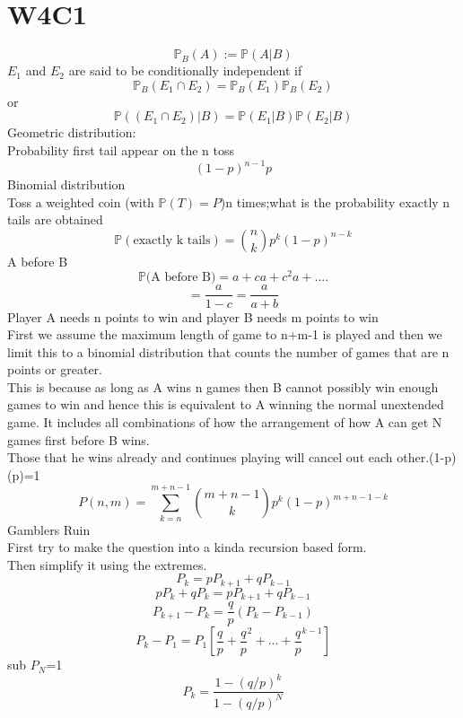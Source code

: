 \documentclass{article}
\begin{document}
\section{W4C1}
$$
\mathbb P_B(A):=\mathbb P(A|B)
$$
$E_1$ and $E_2$ are said to be conditionally independent if
$$
\mathbb P_B(E_1 \cap E_2)=\mathbb P_B(E_1)\mathbb P_B(E_2)
$$
or
$$
\mathbb P((E_1 \cap E_2)|B)=\mathbb P(E_1|B)\mathbb P(E_2|B)
$$
Geometric distribution:\\
Probability first tail appear on the n toss
$$
(1-p)^{n-1}p
$$
Binomial distribution\\
Toss a weighted coin (with $\mathbb P(T)=P$)n times;what is the probability exactly n tails are obtained
$$
\mathbb{P}(\text{exactly k tails})={n \choose k }p^k(1-p)^{n-k}
$$
A before B
$$
\mathbb P{\text{(A before B)}}=a+ca+c^2a+....
$$
$$
=\frac{a}{1-c}=\frac{a}{a+b}
$$
Player A needs n points to win and player B needs m points to win\\
First we assume the maximum length of game to n+m-1 is played and then we limit this to a binomial distribution that counts the number of games that are n points or greater.\\
This is because as long as A wins n games then B cannot possibly win enough games to win and hence this is equivalent to A winning the normal unextended game. It includes all combinations of how the arrangement of how A can get N games first before B wins.\\
Those that he wins already and continues playing will cancel out each other.(1-p)(p)=1\\
$$
P(n,m)=\sum_{k=n}^{m+n-1}{m+n-1 \choose k}p^k(1-p)^{m+n-1-k}
$$
Gamblers Ruin\\
First try to make the question into a kinda recursion based form.\\
Then simplify it using the extremes.
$$
P_k=pP_{k+1}+qP_{k-1}
$$
$$
pP_k+qP_k=pP_{k+1}+qP_{k-1}
$$
$$
P_{k+1}-P_k=\frac{q}{p}(P_k-P_{k-1})
$$
$$
P_k-P_1=P_1[\frac{q}{p}+\frac{q}{p}^2+...+\frac{q}{p}^{k-1}]
$$
sub $P_N$=1
$$
P_k=\frac{1-(q/p)^k}{1-(q/p)^N}
$$
\end{document}
